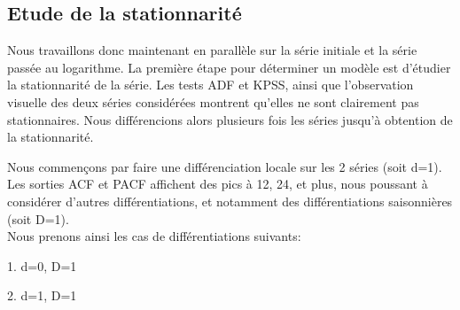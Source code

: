\documentclass[12pt,a4paper]{book}
\newcommand{\1}{\mathds{1}}
\begin{document}
\vspace{60 mm}
\subsection{Etude de la stationnarité}

\vspace{5 mm}

Nous travaillons donc maintenant en parallèle sur la série initiale et la série passée au logarithme.
La première étape pour déterminer un modèle est d'étudier la stationnarité de la série. Les tests ADF et KPSS, ainsi que l'observation visuelle des deux séries considérées montrent qu'elles ne sont clairement pas stationnaires.
Nous différencions alors plusieurs fois les séries jusqu'à obtention de la stationnarité.

Nous commençons par faire une différenciation locale sur les 2 séries (soit d=1). Les sorties ACF et PACF affichent des pics à 12, 24, et plus, nous poussant à considérer d'autres différentiations, et notamment des différentiations saisonnières (soit D=1).\\
Nous prenons ainsi les cas de différentiations suivants:
\begin{description}
  \item 1. d=0, D=1
  \item 2. d=1, D=1
\end{description}
\end{document}
